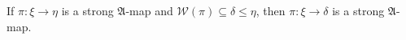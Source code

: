 If $\pi: \xi \rightarrow \eta$ is a strong $\mathfrak{A}$-map and $\mathcal{W}(\pi) \subseteq \delta \leq \eta$, then $\pi: \xi \rightarrow \delta$ is a strong $\mathfrak{A}$-map.
